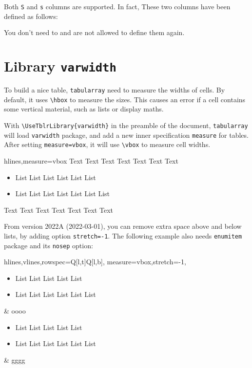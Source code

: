 \documentclass[oneside]{book}
\begin{document}
Both \verb!S! and \verb!s! columns are supported. In fact, These two columns have been defined as follows:
You don't need to and are not allowed to define them again.

\section{Library \texttt{varwidth}}

To build a nice table, \verb!tabularray! need to measure the widths of cells.
By default, it uses \verb!\hbox! to measure the sizes.
This causes an error if a cell contains some vertical material, such as lists or display maths.

With \verb!\UseTblrLibrary{varwidth}! in the preamble of the document,
\verb!tabularray! will load \verb!varwidth! package,
and add a new inner specification \verb!measure! for tables.
After setting \verb!measure=vbox!, it will use \verb!\vbox! to measure cell widths.

\begin{demohigh}
\begin{tblr}{hlines,measure=vbox}
Text Text Text Text Text Text Text
\begin{itemize}
\item List List List List List List
\item List List List List List List List
\end{itemize}
Text Text Text Text Text Text Text \\
\end{tblr}
\end{demohigh}

From version 2022A (2022-03-01), you can remove extra space above and below lists,
by adding option \verb!stretch=-1!.
The following example also needs \verb!enumitem! package and its \verb!nosep! option:

{\centering\begin{tblr}{
hlines,vlines,rowspec={Q[l,t]Q[l,b]},
measure=vbox,stretch=-1,
}
\begin{itemize}[nosep]
\item List List List List List
\item List List List List List List
\end{itemize} & oooo \\
\begin{itemize}[nosep]
\item List List List List List
\item List List List List List List
\end{itemize} & gggg \\
\end{tblr}\par}
\end{document}

